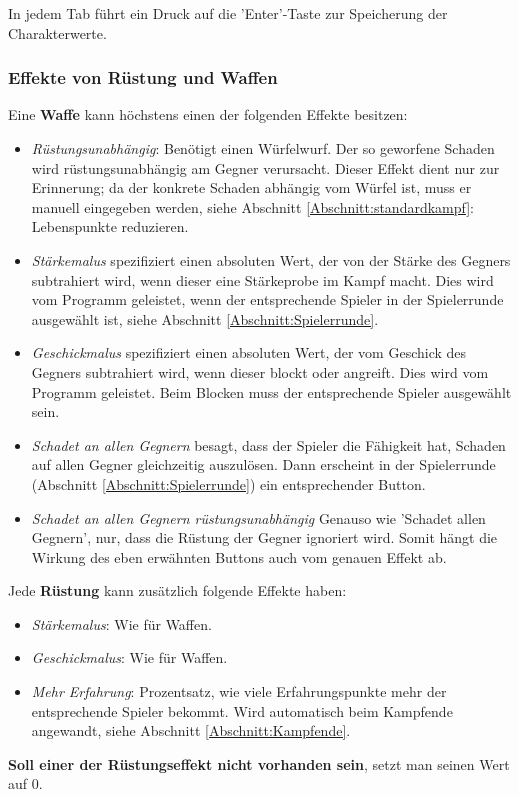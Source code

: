 \documentclass[11pt, a4paper, german]{article}
\begin{document}
In jedem Tab führt ein Druck auf die 'Enter'-Taste zur Speicherung der Charakterwerte.


\subsubsection{Effekte von Rüstung und Waffen} \label{Abschnitt: Effekte}
Eine \textbf{Waffe} kann höchstens einen der folgenden Effekte besitzen:
\begin{itemize}
\item[] \textit{Rüstungsunabhängig}: Benötigt einen Würfelwurf. Der so geworfene Schaden wird rüstungsunabhängig am Gegner verursacht. Dieser Effekt dient nur zur Erinnerung; da der konkrete Schaden abhängig vom Würfel ist, muss er manuell eingegeben werden, siehe Abschnitt \ref{Abschnitt:standardkampf}: Lebenspunkte reduzieren.
\item[] \textit{Stärkemalus} spezifiziert einen absoluten Wert, der von der Stärke des Gegners subtrahiert wird, wenn dieser eine Stärkeprobe im Kampf macht. Dies wird vom Programm geleistet, wenn der entsprechende Spieler in der Spielerrunde ausgewählt ist, siehe Abschnitt \ref{Abschnitt:Spielerrunde}.
\item[] \textit{Geschickmalus} spezifiziert einen absoluten Wert, der vom Geschick des Gegners subtrahiert wird, wenn dieser blockt oder angreift. Dies wird vom Programm geleistet. Beim Blocken muss der entsprechende Spieler ausgewählt sein.
\item[] \textit{Schadet an allen Gegnern} besagt, dass der Spieler die Fähigkeit hat, Schaden auf allen Gegner gleichzeitig auszulösen. Dann erscheint in der Spielerrunde (Abschnitt \ref{Abschnitt:Spielerrunde}) ein entsprechender Button.
\item[] \textit{Schadet an allen Gegnern rüstungsunabhängig} Genauso wie 'Schadet allen Gegnern', nur, dass die Rüstung der Gegner ignoriert wird. Somit hängt die Wirkung des eben erwähnten Buttons auch vom genauen Effekt ab.
\end{itemize}
Jede \textbf{Rüstung} kann zusätzlich folgende Effekte haben:
\begin{itemize}
\item[] \textit{Stärkemalus}: Wie für Waffen.
\item[] \textit{Geschickmalus}: Wie für Waffen.
\item[] \textit{Mehr Erfahrung}: Prozentsatz, wie viele Erfahrungspunkte mehr der entsprechende Spieler bekommt. Wird automatisch beim Kampfende angewandt, siehe Abschnitt \ref{Abschnitt:Kampfende}.
\end{itemize}
\textbf{Soll einer der Rüstungseffekt nicht vorhanden sein}, setzt man seinen Wert auf 0.
\end{document}
